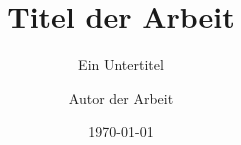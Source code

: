 \title{Titel der Arbeit}
\subtitle{Ein Untertitel}
\author{Autor der Arbeit}
\date{\today}
\maketitle
\thispagestyle{empty}
\clearpage
\tableofcontents